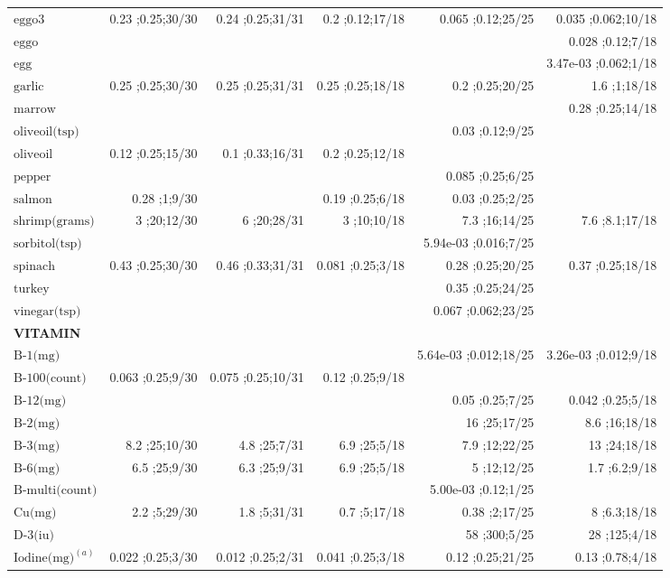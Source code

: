 \begin{table}[H]
\begin{tabular}{|l|r|r|r|r|r|}
$\textrm{eggo3}$&0.23 ;0.25;30/30&0.24 ;0.25;31/31&0.2 ;0.12;17/18&0.065 ;0.12;25/25&0.035 ;0.062;10/18\\
$\textrm{eggo}$&&&&&0.028 ;0.12;7/18\\
$\textrm{egg}$&&&&&3.47e-03 ;0.062;1/18\\
$\textrm{garlic}$&0.25 ;0.25;30/30&0.25 ;0.25;31/31&0.25 ;0.25;18/18&0.2 ;0.25;20/25&1.6 ;1;18/18\\
$\textrm{marrow}$&&&&&0.28 ;0.25;14/18\\
$\textrm{oliveoil(tsp)}$&&&&0.03 ;0.12;9/25&\\
$\textrm{oliveoil}$&0.12 ;0.25;15/30&0.1 ;0.33;16/31&0.2 ;0.25;12/18&&\\
$\textrm{pepper}$&&&&0.085 ;0.25;6/25&\\
$\textrm{salmon}$&0.28 ;1;9/30&&0.19 ;0.25;6/18&0.03 ;0.25;2/25&\\
$\textrm{shrimp(grams)}$&3 ;20;12/30&6 ;20;28/31&3 ;10;10/18&7.3 ;16;14/25&7.6 ;8.1;17/18\\
$\textrm{sorbitol(tsp)}$&&&&5.94e-03 ;0.016;7/25&\\
$\textrm{spinach}$&0.43 ;0.25;30/30&0.46 ;0.33;31/31&0.081 ;0.25;3/18&0.28 ;0.25;20/25&0.37 ;0.25;18/18\\
$\textrm{turkey}$&&&&0.35 ;0.25;24/25&\\
$\textrm{vinegar(tsp)}$&&&&0.067 ;0.062;23/25&\\
{\bf VITAMIN}&&&&&\\
$\textrm{B-1(mg)}$&&&&5.64e-03 ;0.012;18/25&3.26e-03 ;0.012;9/18\\
$\textrm{B-100(count)}$&0.063 ;0.25;9/30&0.075 ;0.25;10/31&0.12 ;0.25;9/18&&\\
$\textrm{B-12(mg)}$&&&&0.05 ;0.25;7/25&0.042 ;0.25;5/18\\
$\textrm{B-2(mg)}$&&&&16 ;25;17/25&8.6 ;16;18/18\\
$\textrm{B-3(mg)}$&8.2 ;25;10/30&4.8 ;25;7/31&6.9 ;25;5/18&7.9 ;12;22/25&13 ;24;18/18\\
$\textrm{B-6(mg)}$&6.5 ;25;9/30&6.3 ;25;9/31&6.9 ;25;5/18&5 ;12;12/25&1.7 ;6.2;9/18\\
$\textrm{B-multi(count)}$&&&&5.00e-03 ;0.12;1/25&\\
$\textrm{Cu(mg)}$&2.2 ;5;29/30&1.8 ;5;31/31&0.7 ;5;17/18&0.38 ;2;17/25&8 ;6.3;18/18\\
$\textrm{D-3(iu)}$&&&&58 ;300;5/25&28 ;125;4/18\\
$\textrm{Iodine(mg)}^{\left(a\right)}$&0.022 ;0.25;3/30&0.012 ;0.25;2/31&0.041 ;0.25;3/18&0.12 ;0.25;21/25&0.13 ;0.78;4/18\\

\end{tabular}
\end{table}
